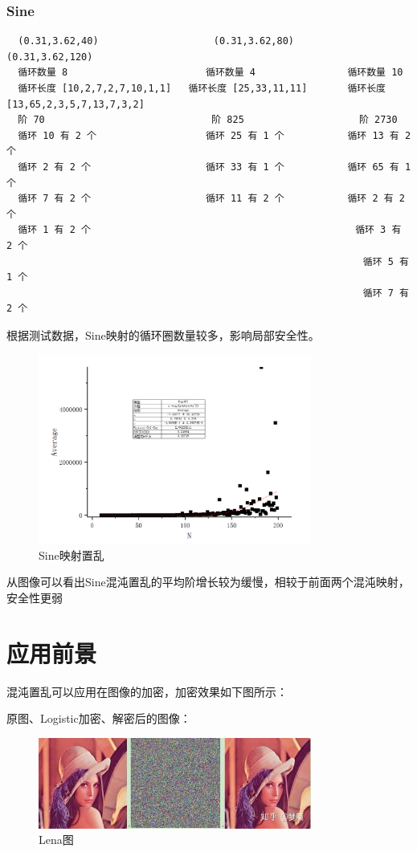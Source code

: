 \documentclass[a4paper]{article}
\begin{document}
\subsubsection{Sine}
\begin{lstlisting}
  (0.31,3.62,40)                    (0.31,3.62,80)            (0.31,3.62,120)
  循环数量 8                        循环数量 4                循环数量 10
  循环长度 [10,2,7,2,7,10,1,1]   循环长度 [25,33,11,11]       循环长度 [13,65,2,3,5,7,13,7,3,2]
  阶 70                             阶 825                    阶 2730
  循环 10 有 2 个                   循环 25 有 1 个           循环 13 有 2 个
  循环 2 有 2 个                    循环 33 有 1 个           循环 65 有 1 个
  循环 7 有 2 个                    循环 11 有 2 个           循环 2 有 2 个
  循环 1 有 2 个                                              循环 3 有 2 个
                                                              循环 5 有 1 个
                                                              循环 7 有 2 个
\end{lstlisting}

根据测试数据，Sine映射的循环圈数量较多，影响局部安全性。

\begin{figure}[H]
  \centering
  \includegraphics[width=0.8\textwidth]{imgs/sine.png}
  \caption{Sine映射置乱}
  \label{Sine}
\end{figure}

从图像可以看出Sine混沌置乱的平均阶增长较为缓慢，相较于前面两个混沌映射，安全性更弱

\clearpage
\section{应用前景}

混沌置乱可以应用在图像的加密，加密效果如下图所示：\par
原图、Logistic加密、解密后的图像：
\begin{figure}[H]
  \centering
  \includegraphics[width=0.8\textwidth]{imgs/lena.jpg}
  \caption{Lena图}
  \label{Lena}
\end{figure}
\end{document}
